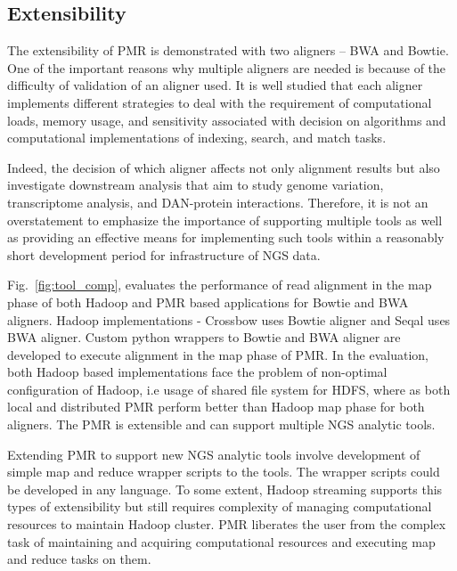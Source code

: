 \documentclass{acm_proc_article-sp}
\begin{document}
\subsection{Extensibility}


The extensibility of PMR is demonstrated with two aligners -- BWA and
Bowtie.  One of the important reasons why multiple aligners are needed
is because of the difficulty of validation of an aligner used\cite{mapping-survey}.  It is
well studied that each aligner implements different strategies to deal
with the requirement of computational loads, memory usage, and
sensitivity associated with decision on algorithms and computational
implementations of indexing, search, and match
tasks.

Indeed, the decision of which aligner affects not only alignment
results but also investigate downstream analysis that aim to study
genome variation, transcriptome analysis, and DAN-protein
interactions. Therefore, it is not an overstatement to emphasize the
importance of supporting multiple tools as well as providing an
effective means for implementing such tools within a reasonably short
development period for infrastructure of NGS data.

Fig.~\ref{fig:tool_comp}, evaluates the performance of read alignment
in the map phase of both Hadoop and PMR based applications for Bowtie
and BWA aligners. Hadoop implementations - Crossbow uses Bowtie
aligner and Seqal uses BWA aligner.  Custom python wrappers to Bowtie
and BWA aligner are developed to execute alignment in the map phase of
PMR. In the evaluation, both Hadoop based implementations face the
problem of non-optimal configuration of Hadoop, i.e usage of shared
file system for HDFS, where as both local and distributed PMR perform
better than Hadoop map phase for both aligners. The PMR is extensible
and can support multiple NGS analytic tools.

Extending PMR to support new NGS analytic tools involve development of
simple map and reduce wrapper scripts to the tools. The wrapper
scripts could be developed in any language.  To some extent, Hadoop streaming supports
this types of extensibility but still requires complexity of managing
computational resources to maintain Hadoop cluster.  PMR liberates the
user from the complex task of maintaining and acquiring computational
resources and executing map and reduce tasks on them.
\end{document}
